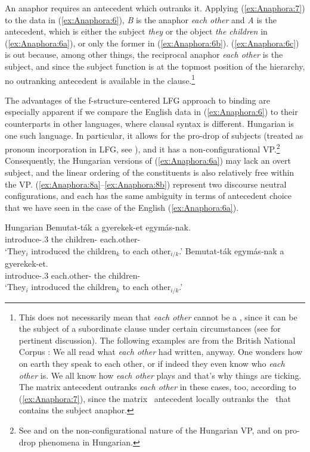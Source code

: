 \documentclass[output=paper,hidelinks]{langscibook}
\begin{document}
\noindent An anaphor requires an antecedent which outranks it. Applying (\ref{ex:Anaphora:7}) to the data in (\ref{ex:Anaphora:6}), \textit{B} is the anaphor \emph{each other} and \textit{A} is the antecedent, which is either the subject \emph{they} or the object \emph{the children} in (\ref{ex:Anaphora:6a}), or only the former in (\ref{ex:Anaphora:6b}). (\ref{ex:Anaphora:6c}) is out because, among other things, the reciprocal anaphor \emph{each other} is the subject, and since the subject function is at the topmost position of the hierarchy, no outranking antecedent is available in the clause.\footnote{\label{fn:Anaphora:4}This does not necessarily mean that \emph{each other} cannot be a \SUBJ, since it can be the subject of a subordinate clause under certain circumstances (see \citet[724]{lebeaux83} for pertinent discussion). The following examples are from the British National Corpus \citep{noauthor_undated-hr}:
\ea We all read what \emph{each other} had written, anyway.
\ex One wonders how on earth they speak to each other, or if indeed they even know who \emph{each other} is.
\ex We all know how \emph{each other} plays and that's why things are ticking.
\z
The matrix antecedent outranks \emph{each other} in these cases, too, according to (\ref{ex:Anaphora:7}), since the matrix \SUBJ\ antecedent locally outranks the \COMP\ that contains the subject anaphor.}

The advantages of the f-structure-centered LFG approach to binding are especially apparent if we compare the English data in (\ref{ex:Anaphora:6}) to their counterparts in other languages, where clausal syntax is different. Hungarian is one such language. In particular, it allows for the pro-drop of subjects (treated as pronoun incorporation in LFG, see ), and it has a non-configurational VP.\footnote{See  and \citealt{Laczko2021} on the non-configurational nature of the Hungarian VP, and on pro-drop phenomena in Hungarian.} Consequently, the Hungarian versions of (\ref{ex:Anaphora:6a}) may lack an overt subject, and the linear ordering of the constituents is also relatively free within the VP. (\ref{ex:Anaphora:8a}--\ref{ex:Anaphora:8b}) represent two discourse neutral configurations, and each has the same ambiguity in terms of antecedent choice that we have seen in the case of the English (\ref{ex:Anaphora:6a}).

\ea\label{ex:Anaphora:8} Hungarian
\ea \label{ex:Anaphora:8a}\gll
Bemutat-ták  a gyerekek-et  egymás-nak.\\
 introduce-\PST.{3\PL} the children-{\ACC}  each.other-{\DAT}\\
 \glt`They$_i$ introduced the children$_k$ to each other$_{i/k}$.'
\ex \label{ex:Anaphora:8b}\gll
Bemutat-ták  egymás-nak  a gyerekek-et.\\
 introduce-{\PST}.{3\PL} each.other-{\DAT} the children-{\ACC}\\
 \glt`They$_i$ introduced the children$_k$ to each other$_{i/k}$.' 
\z\z
\end{document}
